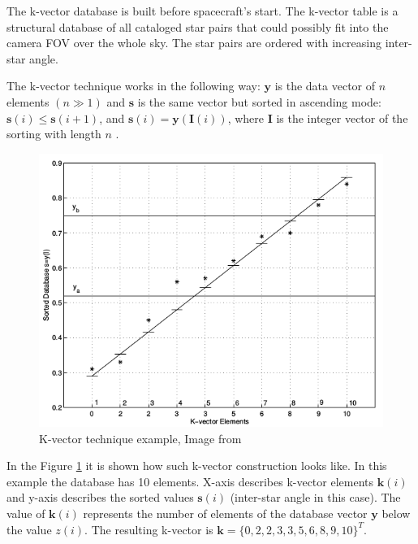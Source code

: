 \documentclass[12pt,a4paper,twoside]{article}
\begin{document}
The k-vector database is built before spacecraft's start. The k-vector table is a structural database of all cataloged star pairs that could possibly fit into the camera FOV over the whole sky. 
The star pairs are ordered with increasing inter-star angle.

The k-vector technique works in the following way: $\bm{y}$ is the data vector of $n$ elements $(n \gg 1)$ and $\bm{s}$ is the same vector but sorted in ascending mode: $\bm{s}(i) \le \bm{s}(i+1)$, and $\bm{s}(i) = \bm{y}(\bm{I}(i))$, where $\bm{I}$ is the integer vector of the sorting with length $n$ \cite{mortari2013k}.


\begin{figure}[!htbp]
\includegraphics[scale=0.57]{k-vector-example.png}
\centering
\caption[K-vector technique example]{K-vector technique example, Image from \citep{mortari2000k}}
\label{fig:k-vector-example}
\end{figure}

In the Figure \ref{fig:k-vector-example} it is shown how such k-vector construction looks like. In this example the database has 10 elements. X-axis describes k-vector elements $\bm{k}(i)$ and y-axis describes the sorted values $\bm{s}(i)$ (inter-star angle in this case). The value of $\bm{k}(i)$ represents the number of elements of the database vector $\bm{y}$ below the value $z(i)$.
The resulting k-vector is $\bm{k} = \{0, 2, 2, 3, 3, 5, 6, 8, 9, 10\}^T$.
\end{document}

